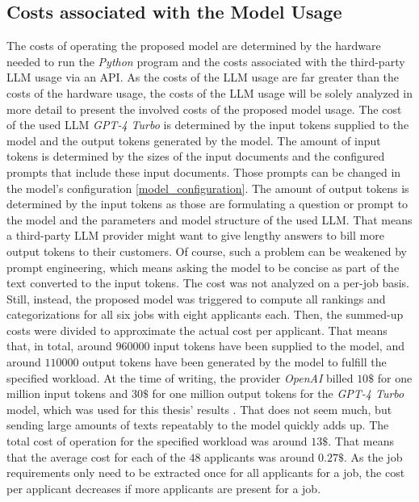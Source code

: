 \documentclass[draft,final]{thesisclass} %
\begin{document}
\subsection{Costs associated with the Model Usage}
The costs of operating the proposed model are determined by the hardware needed to run the \textit{Python} program and the costs associated with the third-party \gls{LLM} usage via an API.
As the costs of the \gls{LLM} usage are far greater than the costs of the hardware usage, the costs of the \gls{LLM} usage will be solely analyzed in more detail to present the involved costs of the proposed model usage. The cost of the used \gls{LLM} \textit{GPT-4 Turbo} is determined by the input tokens supplied to the model and the output tokens generated by the model. The amount of input tokens is determined by the sizes of the input documents and the configured prompts that include these input documents. Those prompts can be changed in the model's configuration \ref{model_configuration}. The amount of output tokens is determined by the input tokens as those are formulating a question or prompt to the model and the parameters and model structure of the used \gls{LLM}. That means a third-party \gls{LLM} provider might want to give lengthy answers to bill more output tokens to their customers. Of course, such a problem can be weakened by prompt engineering, which means asking the model to be concise as part of the text converted to the input tokens. The cost was not analyzed on a per-job basis. Still, instead, the proposed model was triggered to compute all rankings and categorizations for all six jobs with eight applicants each. Then, the summed-up costs were divided to approximate the actual cost per applicant. That means that, in total, around $960000$ input tokens have been supplied to the model, and around $110000$ output tokens have been generated by the model to fulfill the specified workload. At the time of writing, the provider \textit{OpenAI} billed $10\$$ for one million input tokens and $30\$$ for one million output tokens for the \textit{GPT-4 Turbo} model, which was used for this thesis' results \parencite{openai_pricing}. That does not seem much, but sending large amounts of texts repeatably to the model quickly adds up. The total cost of operation for the specified workload was around $13\$$. That means that the average cost for each of the $48$ applicants was around $0.27\$$. As the job requirements only need to be extracted once for all applicants for a job, the cost per applicant decreases if more applicants are present for a job.
\end{document}
